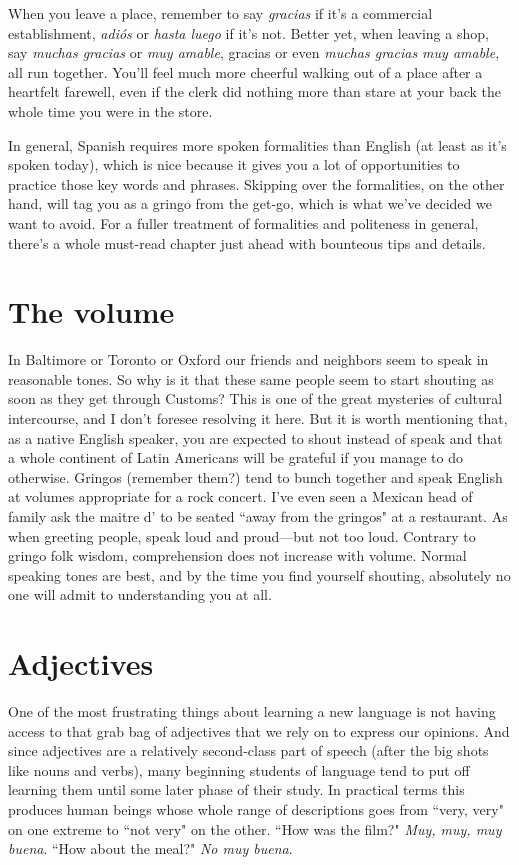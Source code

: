 When you leave a place, remember to say \emph{gracias} if it's a commercial establishment, \emph{adiós} or \emph{hasta luego} if it's not. Better yet,
when leaving a shop, say \emph{muchas gracias} or \emph{muy amable}, gracias or
even \emph{muchas gracias muy amable}, all run together. You'll feel much
more cheerful walking out of a place after a heartfelt farewell, even if
the clerk did nothing more than stare at your back the whole time you
were in the store.

In general, Spanish requires more spoken formalities than English (at least as it's spoken today), which is nice because it gives you a
lot of opportunities to practice those key words and phrases. Skipping
over the formalities, on the other hand, will tag you as a gringo from
the get-go, which is what we've decided we want to avoid. For a fuller
treatment of formalities and politeness in general, there's a whole
must-read chapter just ahead with bounteous tips and details.

\section{The volume}

In Baltimore or Toronto or Oxford our friends and neighbors
seem to speak in reasonable tones. So why is it that these same people
seem to start shouting as soon as they get through Customs? This is
one of the great mysteries of cultural intercourse, and I don't foresee
resolving it here. But it is worth mentioning that, as a native English
speaker, you are expected to shout instead of speak and that a whole
continent of Latin Americans will be grateful if you manage to do otherwise. Gringos (remember them?) tend to bunch together and speak
English at volumes appropriate for a rock concert. I've even seen a
Mexican head of family ask the maitre d' to be seated ``away from the
gringos" at a restaurant. As when greeting people, speak loud and
proud---but not too loud. Contrary to gringo folk wisdom, comprehension does not increase with volume. Normal speaking tones are best,
and by the time you find yourself shouting, absolutely no one will admit to understanding you at all.

\section{Adjectives}

One of the most frustrating things about learning a new language is not having access to that grab bag of adjectives that we rely on
to express our opinions. And since adjectives are a relatively second-class part of speech (after the big shots like nouns and verbs), many
beginning students of language tend to put off learning them until
some later phase of their study. In practical terms this produces human
beings whose whole range of descriptions goes from ``very, very" on
one extreme to ``not very" on the other. ``How was the film?" \emph{Muy,
	muy, muy buena}. ``How about the meal?" \emph{No muy buena}.

